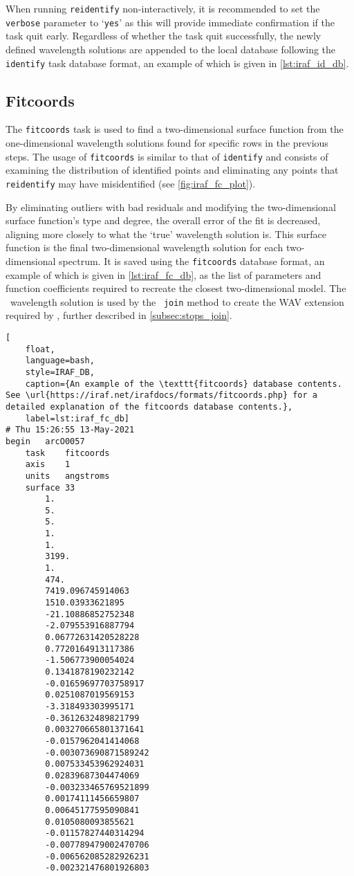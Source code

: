 When running \texttt{reidentify} non-interactively, it is recommended to set the \texttt{verbose} parameter to `\texttt{yes}' as this will provide immediate confirmation if the task quit early.
Regardless of whether the task quit successfully, the newly defined wavelength solutions are appended to the local database following the \texttt{identify} task database format, an example of which is given in \autoref{lst:iraf_id_db}.

\subsection{Fitcoords} \label{subsec:iraf_fitcoords}

The \texttt{fitcoords} task is used to find a two-dimensional surface function from the one-dimensional wavelength solutions found for specific rows in the previous steps.
The usage of \texttt{fitcoords} is similar to that of \texttt{identify} and consists of examining the distribution of identified points and eliminating any points that \texttt{reidentify} may have misidentified (see \autoref{fig:iraf_fc_plot}).

By eliminating outliers with bad residuals and modifying the two-dimensional surface function's type and degree, the overall error of the fit is decreased, aligning more closely to what the `true' wavelength solution is.
This surface function is the final two-dimensional wavelength solution for each two-dimensional spectrum.
It is saved using the \texttt{fitcoords} database format, an example of which is given in \autoref{lst:iraf_fc_db}, as the list of parameters and function coefficients required to recreate the closest two-dimensional model.
The \iraf\ wavelength solution is used by the \stops\ \texttt{join} method to create the \gls{WAV} extension required by \polsalt, further described in \autoref{subsec:stops_join}.

\begin{lstlisting}[
    float,
    language=bash,
    style=IRAF_DB,
    caption={An example of the \texttt{fitcoords} database contents. See \url{https://iraf.net/irafdocs/formats/fitcoords.php} for a detailed explanation of the fitcoords database contents.},
    label=lst:iraf_fc_db]
# Thu 15:26:55 13-May-2021
begin	arcO0057
	task	fitcoords
	axis	1
	units	angstroms
	surface	33
		1.
		5.
		5.
		1.
		1.
		3199.
		1.
		474.
		7419.096745914063
		1510.03933621895
		-21.10886852752348
		-2.079553916887794
		0.06772631420528228
		0.7720164913117386
		-1.506773900054024
		0.1341878190232142
		-0.01659697703758917
		0.0251087019569153
		-3.318493303995171
		-0.3612632489821799
		0.003270665801371641
		-0.0157962041414068
		-0.003073690871589242
		0.007533453962924031
		0.02839687304474069
		-0.003233465769521899
		0.00174111456659807
		0.00645177595090841
		0.0105080093855621
		-0.01157827440314294
		-0.007789479002470706
		-0.006562085282926231
		-0.002321476801926803

\end{lstlisting}

